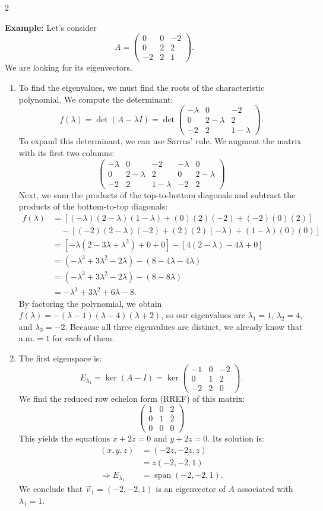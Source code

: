 \documentclass[12pt]{article}
\newcommand{\threebythree}[9]{\begin{pmatrix} %
  #1 & #2 & #3 \\ #4 & #5 & #6 \\ #7 & #8 & #9 \end{pmatrix}}
\newcommand{\To}{\Rightarrow}
\begin{document}
\begin{multicols}{2}
  
 \textbf{Example:}
  Let's consider 
  \[A=\threebythree{0}{0}{-2}{0}{2}{2}{-2}{2}{1}.\] We are looking for its eigenvectors.
  \begin{enumerate}
    \item To find the eigenvalues, we must find the roots of the characteristic polynomial. We compute the determinant: 
    \[f(\lambda) = \det(A-\lambda I) = \det\threebythree{-\lambda}{0}{-2}{0}{2-\lambda}{2}{-2}{2}{1-\lambda}.\]
    To expand this determinant, we can use Sarrus' rule. We augment the matrix with its first two columns:
    \[\left(\begin{array}{ccc|cc}
      -\lambda & 0 & -2 & -\lambda & 0 \\
      0 & 2-\lambda & 2 & 0 & 2-\lambda \\
      -2 & 2 & 1-\lambda & -2 & 2
    \end{array}\right)\]
    Next, we sum the products of the top-to-bottom diagonals and subtract the products of the bottom-to-top diagonals:
    \begin{align*}
      f(\lambda) &= [ (-\lambda)(2-\lambda)(1-\lambda) + (0)(2)(-2) + (-2)(0)(2) ] \\
      &\quad - [ (-2)(2-\lambda)(-2) + (2)(2)(-\lambda) + (1-\lambda)(0)(0) ] \\
      &= [ -\lambda(2 - 3\lambda + \lambda^2) + 0 + 0 ] - [ 4(2-\lambda) - 4\lambda + 0 ] \\
      &= (-\lambda^3 + 3\lambda^2 - 2\lambda) - (8 - 4\lambda - 4\lambda) \\
      &= (-\lambda^3 + 3\lambda^2 - 2\lambda) - (8 - 8\lambda)\\
      &= -\lambda^3 + 3\lambda^2 + 6\lambda - 8.
    \end{align*}
    By factoring the polynomial, we obtain \(f(\lambda) = -(\lambda - 1)(\lambda - 4)(\lambda + 2)\), so our eigenvalues are \(\lambda_1=1\), \(\lambda_2=4\), and \(\lambda_3=-2\). Because all three eigenvalues are distinct, we already know that a.m.\(=1\) for each of them.
    
    \item The first eigenspace is: 
    \[E_{\lambda_1}=\ker(A-I)=\ker\threebythree{-1}{0}{-2}{0}{1}{2}{-2}{2}{0}.\]
    We find the reduced row echelon form (RREF) of this matrix:
    \[
    \threebythree{1}{0}{2}{0}{1}{2}{0}{0}{0}
    \]
    This yields the equations \(x+2z=0\) and \(y+2z=0\). Its solution is: 
    \begin{align*}
      (x,y,z)&=(-2z,-2z,z)\\
      &=z(-2,-2,1)\\
      \To E_{\lambda_1}&=\operatorname{span}(-2,-2,1).
    \end{align*}
    We conclude that \(\vec{v}_1=(-2,-2,1)\) is an eigenvector of \(A\) associated with \(\lambda_1=1\).
    

\end{enumerate}
\end{multicols}
\end{document}
